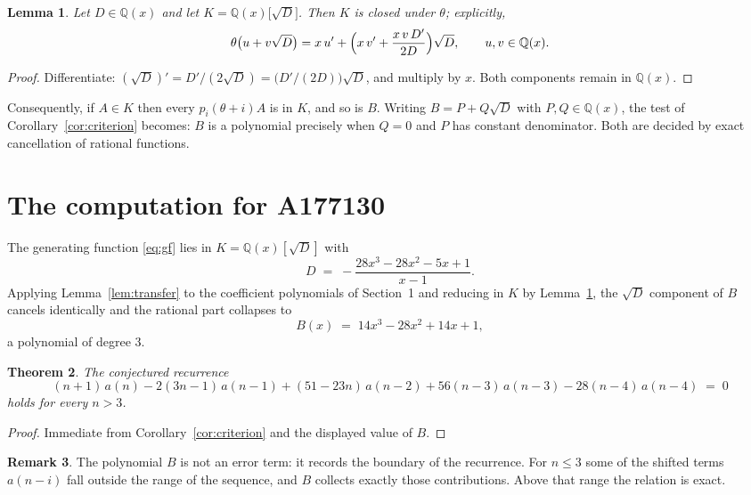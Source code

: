 \documentclass[11pt,a4paper]{article}
\theoremstyle{plain}
\newtheorem{theorem}{Theorem}
\newtheorem{lemma}[theorem]{Lemma}
\theoremstyle{definition}
\newtheorem{remark}[theorem]{Remark}
\begin{document}
\begin{lemma}\label{lem:field}
Let $D\in\mathbb{Q}(x)$ and let $K=\mathbb{Q}(x)\bigl[\sqrt{D}\bigr]$. Then $K$ is closed
under $\theta$; explicitly,
\[
\theta\bigl(u+v\sqrt{D}\bigr)=x\,u'+\Bigl(x\,v'+\frac{x\,v\,D'}{2D}\Bigr)\sqrt{D},
\qquad u,v\in\mathbb{Q}(x).
\]
\end{lemma}

\begin{proof}
Differentiate: $(\sqrt{D})'=D'/(2\sqrt{D})=\bigl(D'/(2D)\bigr)\sqrt{D}$, and multiply by
$x$. Both components remain in $\mathbb{Q}(x)$.
\end{proof}

Consequently, if $A\in K$ then every $p_{i}(\theta+i)A$ is in $K$, and so is $B$. Writing
$B=P+Q\sqrt{D}$ with $P,Q\in\mathbb{Q}(x)$, the test of Corollary~\ref{cor:criterion}
becomes: $B$ is a polynomial precisely when $Q=0$ and $P$ has constant denominator. Both
are decided by exact cancellation of rational functions.

\section{The computation for A177130}

The generating function \eqref{eq:gf} lies in $K=\mathbb{Q}(x)[\sqrt{D}]$ with
\[
D \;=\; - \frac{28 x^{3} - 28 x^{2} - 5 x + 1}{x - 1} .
\]
Applying Lemma~\ref{lem:transfer} to the coefficient polynomials of Section~1 and reducing
in $K$ by Lemma~\ref{lem:field}, the $\sqrt{D}$ component of $B$ cancels identically and
the rational part collapses to
\[
B(x)\;=\;14 x^{3} - 28 x^{2} + 14 x + 1 ,
\]
a polynomial of degree $3$.

\begin{theorem}
The conjectured recurrence
\[
(n + 1)\,a(n) -  2 \left(3 n - 1\right)\,a(n-1) + (51 - 23 n)\,a(n-2) + 56 \left(n - 3\right)\,a(n-3) -  28 \left(n - 4\right)\,a(n-4) \;=\;0
\]
holds for every $n>3$.
\end{theorem}

\begin{proof}
Immediate from Corollary~\ref{cor:criterion} and the displayed value of $B$.
\end{proof}

\begin{remark}
The polynomial $B$ is not an error term: it records the boundary of the recurrence. For
$n\le3$ some of the shifted terms $a(n-i)$ fall outside the range of the sequence,
and $B$ collects exactly those contributions. Above that range the relation is exact.
\end{remark}
\end{document}
